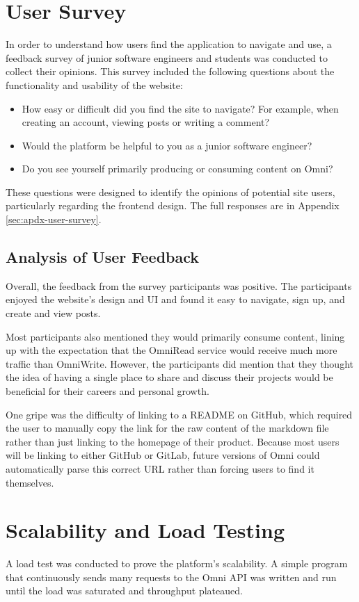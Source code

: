 \section{User Survey}
In order to understand how users find the application to navigate and use, a feedback survey of junior software engineers and students was conducted to collect their opinions.
This survey included the following questions about the functionality and usability of the website:
\begin{itemize}
    \item How easy or difficult did you find the site to navigate? For example, when creating an account, viewing posts or writing a comment?
    \item Would the platform be helpful to you as a junior software engineer?
    \item Do you see yourself primarily producing or consuming content on Omni?
\end{itemize}
These questions were designed to identify the opinions of potential site users, particularly regarding the frontend design.
The full responses are in Appendix \ref{sec:apdx-user-survey}.

\subsection{Analysis of User Feedback}
Overall, the feedback from the survey participants was positive.
The participants enjoyed the website's design and UI and found it easy to navigate, sign up, and create and view posts. 

Most participants also mentioned they would primarily consume content, lining up with the expectation that the OmniRead service would receive much more traffic than OmniWrite.
However, the participants did mention that they thought the idea of having a single place to share and discuss their projects would be beneficial for their careers and personal growth. 

One gripe was the difficulty of linking to a README on GitHub, which required the user to manually copy the link for the raw content of the markdown file rather than just linking to the homepage of their product.
Because most users will be linking to either GitHub or GitLab, future versions of Omni could automatically parse this correct URL rather than forcing users to find it themselves.

\section{Scalability and Load Testing}
A load test was conducted to prove the platform's scalability.
A simple program that continuously sends many requests to the Omni API was written and run until the load was saturated and throughput plateaued.


